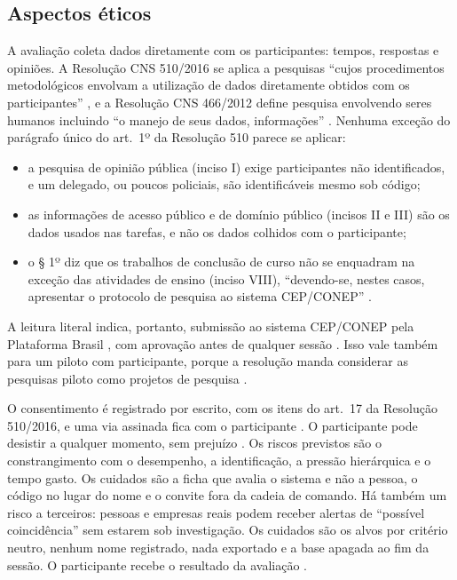 \subsection{Aspectos éticos}
\label{sec:avaliacao-etica}

A avaliação coleta dados diretamente com os participantes: tempos, respostas
e opiniões. A Resolução CNS 510/2016 se aplica a pesquisas ``cujos
procedimentos metodológicos envolvam a utilização de dados diretamente
obtidos com os participantes'' \cite[art.~1º]{cns2016res510}, e a Resolução
CNS 466/2012 define pesquisa envolvendo seres humanos incluindo ``o manejo
de seus dados, informações'' \cite[II.14]{cns2012res466}. Nenhuma exceção do
parágrafo único do art.~1º da Resolução 510 parece se aplicar:
\begin{itemize}
	\item a pesquisa de opinião pública (inciso I) exige participantes não
	identificados, e um delegado, ou poucos policiais, são identificáveis
	mesmo sob código;
	\item as informações de acesso público e de domínio público (incisos II e
	III) são os dados usados nas tarefas, e não os dados colhidos com o
	participante;
	\item o § 1º diz que os trabalhos de conclusão de curso não se enquadram
	na exceção das atividades de ensino (inciso VIII), ``devendo-se, nestes
	casos, apresentar o protocolo de pesquisa ao sistema CEP/CONEP''
	\cite[art.~1º, § 1º]{cns2016res510}.
\end{itemize}
A leitura literal indica, portanto, submissão ao sistema CEP/CONEP pela
Plataforma Brasil \cite[art.~23]{cns2016res510}, com aprovação antes de
qualquer sessão \cite[art.~28, I]{cns2016res510}. Isso vale também para um
piloto com participante, porque a resolução manda considerar as pesquisas
piloto como projetos de pesquisa \cite[art.~2º, XII]{cns2016res510}.

O consentimento é registrado por escrito, com os itens do art.~17 da
Resolução 510/2016, e uma via assinada fica com o participante
\cite[art.~17, § 3º]{cns2016res510}. O participante pode desistir a
qualquer momento, sem prejuízo \cite[art.~9º, II]{cns2016res510}. Os riscos
previstos são o constrangimento com o desempenho, a identificação, a pressão
hierárquica e o tempo gasto. Os cuidados são a ficha que avalia o sistema e
não a pessoa, o código no lugar do nome e o convite fora da cadeia de
comando. Há também um risco a terceiros: pessoas e empresas reais podem
receber alertas de ``possível coincidência'' sem estarem sob investigação. Os
cuidados são os alvos por critério neutro, nenhum nome registrado, nada
exportado e a base apagada ao fim da sessão. O participante recebe o
resultado da avaliação \cite[art.~17, VI]{cns2016res510}.
